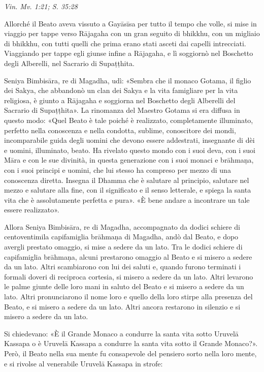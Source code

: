 \emph{Vin. Mv. 1:21; S. 35:28}


Allorché il Beato aveva vissuto a Gayāsīsa per tutto il tempo che volle,
si mise in viaggio per tappe verso Rājagaha con un gran seguito di
bhikkhu, con un migliaio di bhikkhu, con tutti quelli che prima erano
stati asceti dai capelli intrecciati. Viaggiando per tappe egli giunse
infine a Rājagaha, e lì soggiornò nel Boschetto degli Alberelli, nel
Sacrario di Supaṭṭhita.


Seniya Bimbisāra, re di Magadha, udì: «Sembra che il monaco Gotama, il
figlio dei Sakya, che abbandonò un clan dei Sakya e la vita famigliare
per la vita religiosa, è giunto a Rājagaha e soggiorna nel Boschetto
degli Alberelli del Sacrario di Supaṭṭhita». La rinomanza del Maestro
Gotama si era diffusa in questo modo: «Quel Beato è tale poiché è
realizzato, completamente illuminato, perfetto nella conoscenza e nella
condotta, sublime, conoscitore dei mondi, incomparabile guida degli
uomini che devono essere addestrati, insegnante di dèi e uomini,
illuminato, beato. Ha rivelato questo mondo con i suoi deva, con i suoi
Māra e con le sue divinità, in questa generazione con i suoi monaci e
brāhmaṇa, con i suoi principi e uomini, che lui stesso ha compreso per
mezzo di una conoscenza diretta. Insegna il Dhamma che è salutare al
principio, salutare nel mezzo e salutare alla fine, con il significato e
il senso letterale, e spiega la santa vita che è assolutamente perfetta
e pura». «È bene andare a incontrare un tale essere realizzato».


Allora Seniya Bimbisāra, re di Magadha, accompagnato da dodici schiere
di centoventimila capifamiglia brāhmaṇa di Magadha, andò dal Beato, e
dopo avergli prestato omaggio, si mise a sedere da un lato. Tra le
dodici schiere di capifamiglia brāhmaṇa, alcuni prestarono omaggio al
Beato e si misero a sedere da un lato. Altri scambiarono con lui dei
saluti e, quando furono terminati i formali doveri di reciproca
cortesia, si misero a sedere da un lato. Altri levarono le palme giunte
delle loro mani in saluto del Beato e si misero a sedere da un lato.
Altri pronunciarono il nome loro e quello della loro stirpe alla
presenza del Beato, e si misero a sedere da un lato. Altri ancora
restarono in silenzio e si misero a sedere da un lato.


Si chiedevano: «È il Grande Monaco a condurre la santa vita sotto
Uruvelā Kassapa o è Uruvelā Kassapa a condurre la santa vita sotto il
Grande Monaco?». Però, il Beato nella sua mente fu consapevole del
pensiero sorto nella loro mente, e si rivolse al venerabile Uruvelā
Kassapa in strofe:


